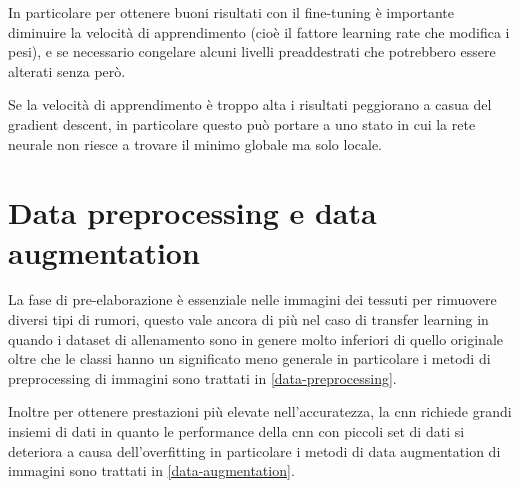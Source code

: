 In particolare per ottenere buoni risultati con il fine-tuning è importante diminuire la velocità di apprendimento (cioè il fattore learning rate che modifica i pesi), e se necessario congelare alcuni livelli preaddestrati che potrebbero essere alterati senza però.

Se la velocità di apprendimento è troppo alta i risultati peggiorano a casua del gradient descent, in particolare questo può portare a uno stato in cui la rete neurale non riesce a trovare il minimo globale ma solo locale\cite{joel_ft_tl_lfs}\cite{joel_tl}.

\section{Data preprocessing e data augmentation}\label{data-pre-processing-e-augmentation-processing}

La fase di pre-elaborazione è essenziale nelle immagini dei tessuti per rimuovere diversi tipi di rumori, questo vale ancora di più nel caso di transfer learning in quando i dataset di allenamento sono in genere molto inferiori di quello originale oltre che le classi hanno un significato meno generale\cite{joel_tl} in particolare i metodi di preprocessing di immagini sono trattati in \cref{data-preprocessing}.

Inoltre per ottenere prestazioni più elevate nell'accuratezza, la \gls{cnn} richiede grandi insiemi di dati in quanto le performance della \gls{cnn} con piccoli set di dati si deteriora  a causa dell'\gls{overfitting}\cite{joel_tl} in particolare i metodi di data augmentation di immagini sono trattati in \cref{data-augmentation}.





